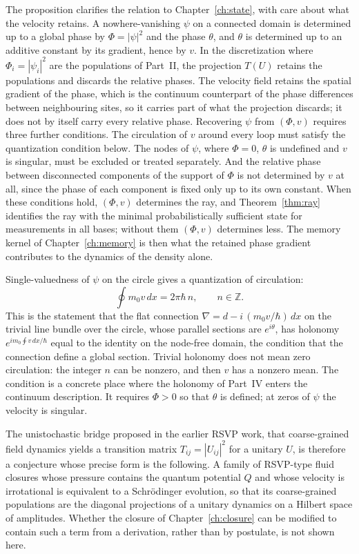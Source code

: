 \documentclass[11pt,oneside]{book}
\theoremstyle{definition}
\theoremstyle{remark}
\begin{document}
The proposition clarifies the relation to Chapter~\ref{ch:state}, with care about what the velocity retains. A nowhere-vanishing $\psi$ on a connected domain is determined up to a global phase by $\Phi=|\psi|^2$ and the phase $\theta$, and $\theta$ is determined up to an additive constant by its gradient, hence by $v$. In the discretization where $\Phi_i=|\psi_i|^2$ are the populations of Part~II, the projection $T(U)$ retains the populations and discards the relative phases. The velocity field retains the spatial gradient of the phase, which is the continuum counterpart of the phase differences between neighbouring sites, so it carries part of what the projection discards; it does not by itself carry every relative phase. Recovering $\psi$ from $(\Phi,v)$ requires three further conditions. The circulation of $v$ around every loop must satisfy the quantization condition below. The nodes of $\psi$, where $\Phi=0$, $\theta$ is undefined and $v$ is singular, must be excluded or treated separately. And the relative phase between disconnected components of the support of $\Phi$ is not determined by $v$ at all, since the phase of each component is fixed only up to its own constant. When these conditions hold, $(\Phi,v)$ determines the ray, and Theorem~\ref{thm:ray} identifies the ray with the minimal probabilistically sufficient state for measurements in all bases; without them $(\Phi,v)$ determines less. The memory kernel of Chapter~\ref{ch:memory} is then what the retained phase gradient contributes to the dynamics of the density alone.

Single-valuedness of $\psi$ on the circle gives a quantization of circulation:
\[
\oint m_0v\,dx=2\pi\hbar\,n,\qquad n\in\mathbb Z .
\]
This is the statement that the flat connection $\nabla=d-i\,(m_0v/\hbar)\,dx$ on the trivial line bundle over the circle, whose parallel sections are $e^{i\theta}$, has holonomy $e^{i m_0\oint v\,dx/\hbar}$ equal to the identity on the node-free domain, the condition that the connection define a global section. Trivial holonomy does not mean zero circulation: the integer $n$ can be nonzero, and then $v$ has a nonzero mean. The condition is a concrete place where the holonomy of Part~IV enters the continuum description. It requires $\Phi>0$ so that $\theta$ is defined; at zeros of $\psi$ the velocity is singular.

The unistochastic bridge proposed in the earlier RSVP work, that coarse-grained field dynamics yields a transition matrix $T_{ij}=|U_{ij}|^2$ for a unitary $U$, is therefore a conjecture whose precise form is the following. A family of RSVP-type fluid closures whose pressure contains the quantum potential $Q$ and whose velocity is irrotational is equivalent to a Schr\"odinger evolution, so that its coarse-grained populations are the diagonal projections of a unitary dynamics on a Hilbert space of amplitudes. Whether the closure of Chapter~\ref{ch:closure} can be modified to contain such a term from a derivation, rather than by postulate, is not shown here.
\end{document}

